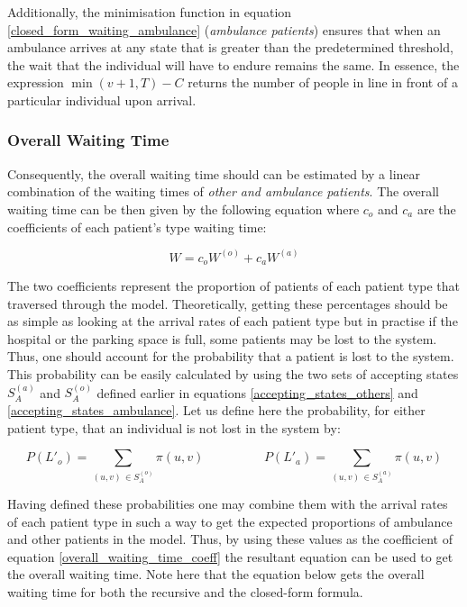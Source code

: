 Additionally, the minimisation function in equation \ref{closed_form_waiting_ambulance} 
(\textit{ambulance patients}) ensures that when an ambulance arrives at any state 
that is greater than the predetermined threshold, the wait that the individual will 
have to endure remains the same. 
In essence, the expression \(\min(v+1,T) - C\) returns the number of people in line 
in front of a particular individual upon arrival.


\subsubsection{Overall Waiting Time}

Consequently, the overall waiting time should can be estimated by a linear combination 
of the waiting times of \textit{other and ambulance patients}. 
The overall waiting time can be then given by the following equation where \(c_o\) 
and \(c_a\) are the coefficients of each patient's type waiting time:

\begin{equation}\label{overall_waiting_time_coeff}
    W = c_o W^{(o)} + c_a W^{(a)}
\end{equation}

The two coefficients represent the proportion of patients of each patient type that 
traversed through the model. 
Theoretically, getting these percentages should be as simple as looking at the arrival 
rates of each patient type but in practise if the hospital or the parking space 
is full, some patients may be lost to the system. 
Thus, one should account for the probability that a patient is lost to the system. 
This probability can be easily calculated by using the two sets of accepting states 
\(S_A^{(a)}\) and \(S_A^{(o)}\) defined earlier in equations \ref{accepting_states_others} 
and \ref{accepting_states_ambulance}. 
Let us define here the probability, for either patient type, that an individual 
is not lost in the system by:

\begin{equation*}
    P(L'_o) = \sum_{(u,v) \, \in S_A^{(o)}} \pi(u,v) \hspace{2cm}
    P(L'_a) = \sum_{(u,v) \, \in S_A^{(a)}} \pi(u,v)
\end{equation*}

Having defined these probabilities one may combine them with the arrival rates of 
each patient type in such a way to get the expected proportions of ambulance and 
other patients in the model. 
Thus, by using these values as the coefficient of equation \ref{overall_waiting_time_coeff} 
the resultant equation can be used to get the overall waiting time. 
Note here that the equation below gets the overall waiting time for both the recursive 
and the closed-form formula.

